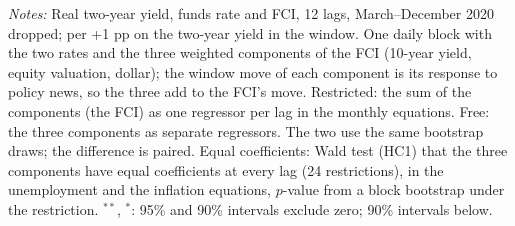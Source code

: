 \begin{table}[tp]
{\begin{tabular}{lrrrr}
\bottomrule\end{tabular}}
\begin{flushleft}\footnotesize\textit{Notes:} Real two-year yield, funds rate and FCI, 12 lags, March--December 2020 dropped; per +1 pp on the two-year yield in the window. One daily block with the two rates and the three weighted components of the FCI (10-year yield, equity valuation, dollar); the window move of each component is its response to policy news, so the three add to the FCI's move. Restricted: the sum of the components (the FCI) as one regressor per lag in the monthly equations. Free: the three components as separate regressors. The two use the same bootstrap draws; the difference is paired. Equal coefficients: Wald test (HC1) that the three components have equal coefficients at every lag (24 restrictions), in the unemployment and the inflation equations, $p$-value from a block bootstrap under the restriction. $^{**}$, $^{*}$: 95\% and 90\% intervals exclude zero; 90\% intervals below.\end{flushleft}
\end{table}
